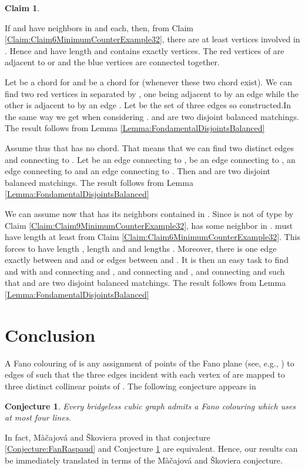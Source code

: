 \documentclass{elsart}
\theoremstyle{plain} \theoremheaderfont{\scshape}
\newtheorem{Clm}{Claim}[Thm]
\newtheorem{Conj}[Thm]{{\bf Conjecture}}
\newenvironment{Prf}{{\bf \noindent Proof } }{\hfill\\}
\newenvironment{PrfClaim}{{\bf Proof }}{{\hfill\tiny{\\}}}
\begin{document}
\begin{Prf}
\begin{Clm}
\end{Clm}
\begin{PrfClaim}
If   and  have neighbors in  and  each, then,
from Claim \ref{Claim:Claim6MinimumCounterExample32}, there are at
least  vertices involved in . Hence  and
 have length  and  contains exactly 
vertices. The  red vertices of  are adjacent to
 or  and the blue vertices are connected together.

Let  be a chord for  and  be a chord for  (whenever
these two chord exist). We can find two red vertices in 
separated by , one being adjacent to  by an edge  while
the other is adjacent to  by an edge . Let  be
the  set of three edges so constructed.In the same way we get
 when considering .  and  are two
disjoint balanced matchings. The result follows from Lemma
\ref{Lemma:FondamentalDisjointsBalanced}

Assume thus that  has no chord. That means that we can find two
distinct edges  and  connecting  to . Let  be an
edge connecting  to ,  be an edge connecting  to
,  an edge connecting  to  and  an edge
connecting  to . Then  and 
are two disjoint balanced matchings. The result follows from
Lemma \ref{Lemma:FondamentalDisjointsBalanced}
\end{PrfClaim}

We can assume now that  has its neighbors contained in .
Since  is not of type  by Claim
\ref{Claim:Claim9MinimumCounterExample32},  has some neighbor
in .  must have length  at least from Claim
\ref{Claim:Claim6MinimumCounterExample32}. This forces  to have
length , 
 length  and  and  lengths . Moreover, there is one
 edge exactly between  and  and  or  edges between
  and . It is then an easy task to find  and
  with  and  connecting  and ,  and  connecting
  and ,  and  connecting  and  such that
  and  are two disjoint balanced matchings. The result follows from
Lemma \ref{Lemma:FondamentalDisjointsBalanced}
\end{Prf}

\section{Conclusion}

A Fano colouring of  is any assignment of points of the Fano
plane  (see, e.g., \cite{MacSko}) to edges of  such
that the three edges incident with each vertex of  are mapped to
three distinct collinear points of  . The following
conjecture appears in \cite{MacSko}

\begin{Conj}\cite{MacSko} \label{Conjecture:MacajovaSkoviera} Every
bridgeless cubic graph admits a  Fano colouring which uses at most
four lines.
\end{Conj}

In fact, M\`{a}\v{c}ajov\'{a} and  \v{S}koviera  proved in
\cite{MacSko} that conjecture \ref{Conjecture:FanRaspaud} and
Conjecture \ref{Conjecture:MacajovaSkoviera} are equivalent. Hence,
our results can be immediately translated in terms of the
M\`{a}\v{c}ajov\'{a} and \v{S}koviera conjecture.









\end{document}
